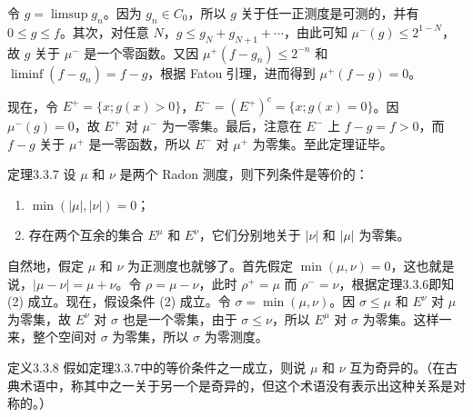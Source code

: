 令 $g=\limsup g_n$。因为 $g_n\in C_0$，所以 $g$ 关于任一正测度是可测的，并有 $0\le g\le f$。其次，对任意 $N$，$g\le g_N+g_{N+1}+\cdots$，由此可知 $\mu^-(g)\le2^{1-N}$，故 $g$ 关于 $\mu^-$ 是一个零函数。又因 $\mu^+(f-g_n)\le2^{-n}$ 和 $\liminf(f-g_n)=f-g$，根据 Fatou 引理，进而得到 $\mu^+(f-g)=0$。

现在，令 $E^+=\{x;g(x)>0\}$，$E^-=(E^+)^c=\{x;g(x)=0\}$。因 $\mu^-(g)=0$，故 $E^+$ 对 $\mu^-$ 为一零集。最后，注意在 $E^-$ 上 $f-g=f>0$，而 $f-g$ 关于 $\mu^+$ 是一零函数，所以 $E^-$ 对 $\mu^+$ 为零集。至此定理证毕。
\begin{statement}{定理}{3.3.7}
设 $\mu$ 和 $\nu$ 是两个 Radon 测度，则下列条件是等价的：
\begin{enumerate}[label=(\arabic*)]
\item $\min(|\mu|,|\nu|)=0$；
\item 存在两个互余的集合 $E^\mu$ 和 $E^\nu$，它们分别地关于 $|\nu|$ 和 $|\mu|$ 为零集。
\end{enumerate}
\end{statement}
\Proof 自然地，假定 $\mu$ 和 $\nu$ 为正测度也就够了。首先假定
$\min(\mu,\nu)=0$，这也就是说，$|\mu-\nu|=\mu+\nu$。令 $\rho=\mu-\nu$，此时 $\rho^+=\mu$ 而 $\rho^-=\nu$，根据定理3.3.6即知 (2) 成立。现在，假设条件 (2) 成立。令 $\sigma=\min(\mu,\nu)$。因 $\sigma\le\mu$ 和 $E^\nu$ 对 $\mu$ 为零集，故 $E^\nu$ 对 $\sigma$ 也是一个零集，由于 $\sigma\le\nu$，所以 $E^\mu$ 对 $\sigma$ 为零集。这样一来，整个空间对 $\sigma$ 为零集，所以 $\sigma$ 为零测度。
\begin{statement}{定义}{3.3.8}
假如定理3.3.7中的等价条件之一成立，则说 $\mu$ 和 $\nu$ 互为奇异的。（在古典术语中，称其中之一关于另一个是奇异的，但这个术语没有表示出这种关系是对称的。）
\end{statement}
